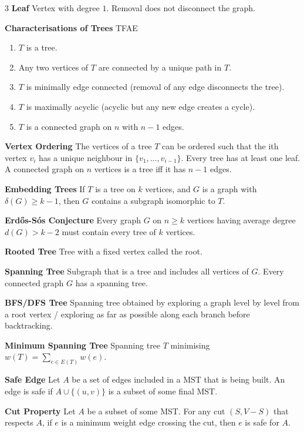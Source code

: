 \documentclass[10pt, landscape]{article}
\begin{document}
\begin{multicols*}{3}
\textbf{Leaf} Vertex with degree $1$. Removal does not disconnect the graph.

\textbf{Characterisations of Trees} TFAE
\begin{enumerate}
    \item $T$ is a tree.
    \item Any two vertices of $T$ are connected by a unique path in $T$.
    \item $T$ is minimally edge connected (removal of any edge disconnects the tree).
    \item $T$ is maximally acyclic (acyclic but any new edge creates a cycle).
    \item $T$ is a connected graph on $n$ with $n-1$ edges.
\end{enumerate}

\textbf{Vertex Ordering} The vertices of a tree $T$ can be ordered such that the ith vertex $v_i$ has a unique neighbour in $\{v_1,...,v_{i-1}\}$. Every tree has at least one leaf. A connected graph on $n$ vertices is a tree iff it has $n-1$ edges.

\textbf{Embedding Trees} If $T$ is a tree on $k$ vertices, and $G$ is a graph with $\delta(G) \geq k-1$, then $G$ contains a subgraph isomorphic to $T$.

\textbf{Erdős-Sós Conjecture} Every graph $G$ on $n \geq k$ vertices having average degree $d(G) > k-2$ must contain every tree of $k$ vertices.

\textbf{Rooted Tree} Tree with a fixed vertex called the root.

\textbf{Spanning Tree} Subgraph that is a tree and includes all vertices of $G$. Every connected graph $G$ has a spanning tree.

\textbf{BFS/DFS Tree} Spanning tree obtained by exploring a graph level by level from a root vertex / exploring as far as possible along each branch before backtracking.


\textbf{Minimum Spanning Tree} Spanning tree $T$ minimising $w(T)=\sum_{e \in E(T)} w(e)$.

\textbf{Safe Edge} Let $A$ be a set of edges included in a MST that is being built. An edge is safe if $A \cup \{(u,v)\}$ is a subset of some final MST.

\textbf{Cut Property} Let $A$ be a subset of some MST. For any cut $(S, V-S)$ that respects $A$, if $e$ is a minimum weight edge crossing the cut, then $e$ is safe for $A$.


\end{multicols*}
\end{document}
